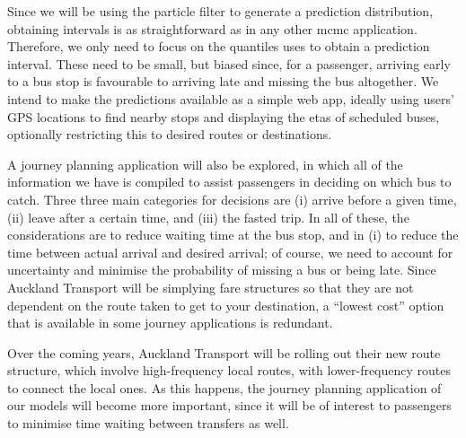 \documentclass[12pt,a4paper]{article}
\begin{document}
Since we will be using the particle filter to generate a prediction distribution,
obtaining intervals is as straightforward as in any other \gls{mcmc} application.
Therefore, we only need to focus on the quantiles uses to obtain a prediction interval.
These need to be small, 
but biased since, for a passenger, 
arriving early to a bus stop is favourable to arriving late and missing the bus altogether.
We intend to make the predictions available as a simple web app,
ideally using users' GPS locations to find nearby stops and displaying the \glspl{eta} of 
scheduled buses,
optionally restricting this to desired routes or destinations.


A journey planning application will also be explored,
in which all of the information we have is compiled to assist passengers
in deciding on which bus to catch.
Three three main categories for decisions are
(i) arrive before a given time, (ii) leave after a certain time,
and (iii) the fasted trip.
In all of these, the considerations are to reduce waiting time at the bus stop,
and in (i) to reduce the time between actual arrival and desired arrival;
of course, we need to account for uncertainty and minimise the probability of missing a bus
or being late.
Since Auckland Transport will be simplying fare structures so that they are not dependent 
on the route taken to get to your destination,
a ``lowest cost'' option that is available in some journey applications is redundant.


Over the coming years, Auckland Transport will be rolling out their new route structure,
which involve high-frequency local routes, 
with lower-frequency routes to connect the local ones.
As this happens, the journey planning application of our models will become more important,
since it will be of interest to passengers to minimise time waiting between transfers as well.




\end{document}
